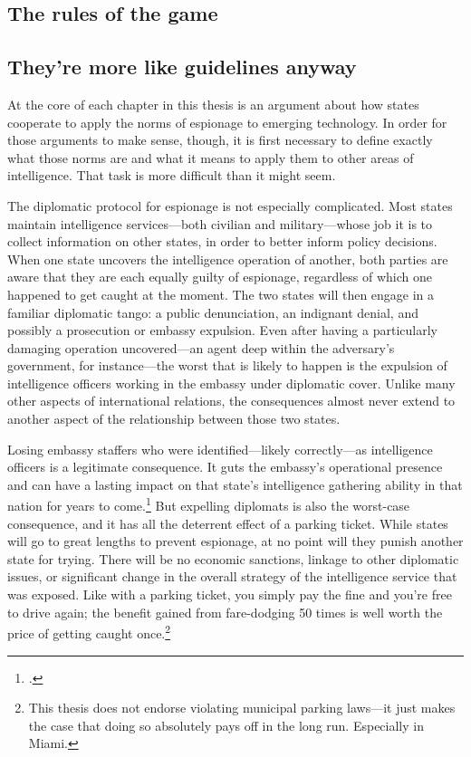 \documentclass[11pt]{memoir}
\begin{document}
\begin{refsegment}

\section{The rules of the game}
\subsection{They're more like guidelines anyway}
At the core of each chapter in this thesis is an argument about how states cooperate to apply the norms of espionage to emerging technology. In order for those arguments to make sense, though, it is first necessary to define exactly what those norms are and what it means to apply them to other areas of intelligence. That task is more difficult than it might seem.

The diplomatic protocol for espionage is not especially complicated. Most states maintain intelligence services---both civilian and military---whose job it is to collect information on other states, in order to better inform policy decisions. When one state uncovers the intelligence operation of another, both parties are aware that they are each equally guilty of espionage, regardless of which one happened to get caught at the moment. The two states will then engage in a familiar diplomatic tango: a public denunciation, an indignant denial, and possibly a prosecution or embassy expulsion. Even after having a particularly damaging operation uncovered---an agent deep within the adversary's government, for instance---the worst that is likely to happen is the expulsion of intelligence officers working in the embassy under diplomatic cover. Unlike many other aspects of international relations, the consequences almost never extend to another aspect of the relationship between those two states.

Losing embassy staffers who were identified---likely correctly---as intelligence officers is a legitimate consequence. It guts the embassy's operational presence and can have a lasting impact on that state's intelligence gathering ability in that nation for years to come.\footcite{macintyre_spy_2018} But expelling diplomats is also the worst-case consequence, and it has all the deterrent effect of a parking ticket. While states will go to great lengths to prevent espionage, at no point will they punish another state for trying. There will be no economic sanctions, linkage to other diplomatic issues, or significant change in the overall strategy of the intelligence service that was exposed. Like with a parking ticket, you simply pay the fine and you're free to drive again; the benefit gained from fare-dodging 50 times is well worth the price of getting caught once.\footnote{This thesis does not endorse violating municipal parking laws---it just makes the case that doing so absolutely pays off in the long run. Especially in Miami.}


\end{refsegment}
\end{document}
